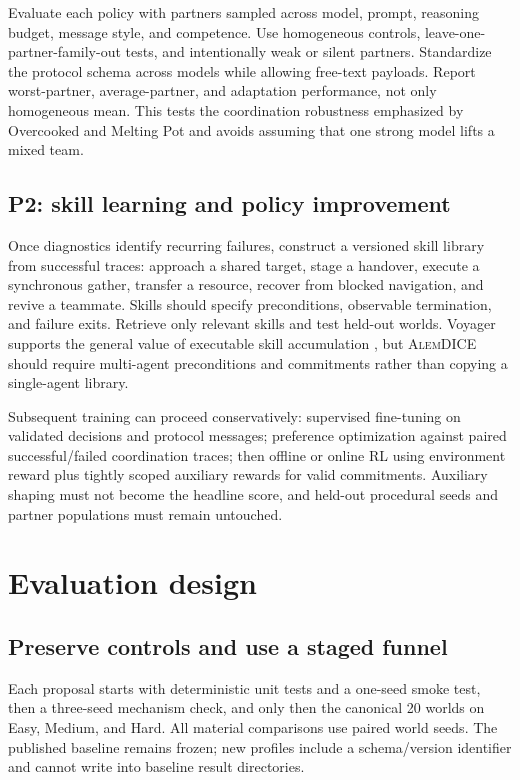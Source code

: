 \documentclass[11pt]{article}
\newcommand{\dice}{\textsc{AlemDICE}}
\begin{document}
Evaluate each policy with partners sampled across model, prompt, reasoning budget, message style,
and competence.  Use homogeneous controls, leave-one-partner-family-out tests, and intentionally
weak or silent partners.  Standardize the protocol schema across models while allowing free-text
payloads.  Report worst-partner, average-partner, and adaptation performance, not only homogeneous
mean.  This tests the coordination robustness emphasized by Overcooked and Melting Pot
\cite{carroll2019overcooked,leibo2021meltingpot} and avoids assuming that one strong model lifts a
mixed team.

\subsection{P2: skill learning and policy improvement}

Once diagnostics identify recurring failures, construct a versioned skill library from successful
traces: approach a shared target, stage a handover, execute a synchronous gather, transfer a resource,
recover from blocked navigation, and revive a teammate.  Skills should specify preconditions,
observable termination, and failure exits.  Retrieve only relevant skills and test held-out worlds.
Voyager supports the general value of executable skill accumulation \cite{wang2024voyager}, but
\dice{} should require multi-agent preconditions and commitments rather than copying a single-agent
library.

Subsequent training can proceed conservatively: supervised fine-tuning on validated decisions and
protocol messages; preference optimization against paired successful/failed coordination traces; then
offline or online RL using environment reward plus tightly scoped auxiliary rewards for valid
commitments.  Auxiliary shaping must not become the headline score, and held-out procedural seeds
and partner populations must remain untouched.

\section{Evaluation design}

\subsection{Preserve controls and use a staged funnel}

Each proposal starts with deterministic unit tests and a one-seed smoke test, then a three-seed
mechanism check, and only then the canonical 20 worlds on Easy, Medium, and Hard.  All material
comparisons use paired world seeds.  The published baseline remains frozen; new profiles include a
schema/version identifier and cannot write into baseline result directories.
\end{document}
